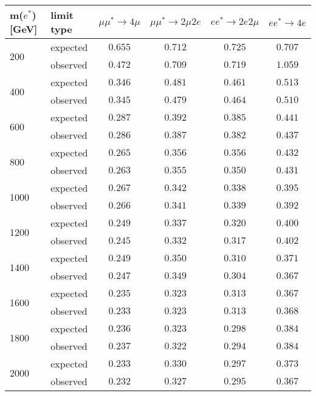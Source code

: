 \begin{table}[h!]
\begin{center}
\begin{tabular}{|l|l|c|c|c|c|}
\hline
m($e^{*}$) [GeV] & limit type & $\mu\mu^{*} \rightarrow 4\mu$ & $\mu\mu^{*} \rightarrow 2\mu 2e$  & $ee^{*} \rightarrow 2e 2\mu$& $ee^{*} \rightarrow 4e$ \\
\hline
\multirow{2}{*}{200} & expected & $0.655$ & $0.712$ & $0.725$ & $0.707$ \\
		     & observed & $0.472$ & $0.709$ & $0.719$ & $1.059$ \\
\hline
\multirow{2}{*}{400} & expected & $0.346$ & $0.481$ & $0.461$ & $0.513$ \\
		     & observed & $0.345$ & $0.479$ & $0.464$ & $0.510$ \\
\hline
\multirow{2}{*}{600} & expected & $0.287$ & $0.392$ & $0.385$ & $0.441$ \\
		     & observed & $0.286$ & $0.387$ & $0.382$ & $0.437$ \\
\hline
\multirow{2}{*}{800} & expected & $0.265$ & $0.356$ & $0.356$ & $0.432$ \\
		     & observed & $0.263$ & $0.355$ & $0.350$ & $0.431$ \\
\hline
\multirow{2}{*}{1000} & expected & $0.267$ & $0.342$ & $0.338$ & $0.395$ \\
		      & observed & $0.266$ & $0.341$ & $0.339$ & $0.392$ \\
\hline
\multirow{2}{*}{1200} & expected & $0.249$ & $0.337$ & $0.320$ & $0.400$ \\
		      & observed & $0.245$ & $0.332$ & $0.317$ & $0.402$ \\
\hline
\multirow{2}{*}{1400} & expected & $0.249$ & $0.350$ & $0.310$ & $0.371$ \\
		      & observed & $0.247$ & $0.349$ & $0.304$ & $0.367$ \\
\hline
\multirow{2}{*}{1600} & expected & $0.235$ & $0.323$ & $0.313$ & $0.367$ \\
		      & observed & $0.233$ & $0.323$ & $0.313$ & $0.368$ \\
\hline
\multirow{2}{*}{1800} & expected & $0.236$ & $0.323$ & $0.298$ & $0.384$ \\
		      & observed & $0.237$ & $0.322$ & $0.294$ & $0.384$ \\
\hline
\multirow{2}{*}{2000} & expected & $0.233$ & $0.330$ & $0.297$ & $0.373$ \\
		      & observed & $0.232$ & $0.327$ & $0.295$ & $0.367$ \\

\end{tabular}
\end{center}
\end{table}
